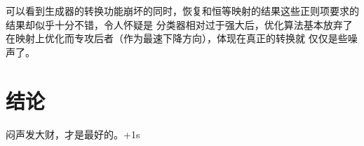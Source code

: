 \documentclass[twocolumn,11pt]{ctexart}
\begin{document}
可以看到生成器的转换功能崩坏的同时，恢复和恒等映射的结果这些正则项要求的结果却似乎十分不错，令人怀疑是
分类器相对过于强大后，优化算法基本放弃了在映射上优化而专攻后者（作为最速下降方向），体现在真正的转换就
仅仅是些噪声了。

\section{结论}

闷声发大财，才是最好的。+1s


 

%
\end{document}

